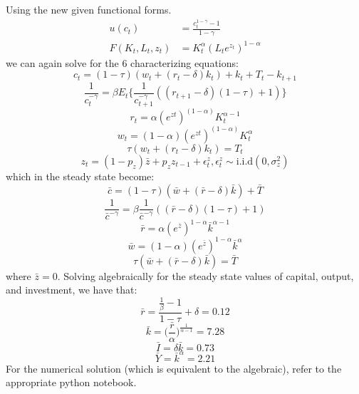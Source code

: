 \documentclass[12pt]{article}
\newenvironment{problem}[2][Problem]{\begin{trivlist}
\item[\hskip \labelsep {\bfseries #1}\hskip \labelsep {\bfseries #2}]}{\end{trivlist}}
\begin{document}
\begin{problem}{5.} 
Using the new given functional forms.
\begin{equation}\label{DSGE_HW_NoLeisure_eq01}
\begin{split}
u(c_t) & = \frac{c^{1-\gamma}_t -1}{1-\gamma}      \\
F(K_t,L_t,z_t) & = K^{\alpha}_t (L_te^{z_t})^{1-\alpha}  \nonumber
\end{split}
\end{equation}
we can again solve for the 6 characterizing equations: 
$$c_t = (1-\tau)(w_t+ (r_t -\delta)k_t) + k_t + T_t - k_{t+1}$$
$$\frac{1}{c_t^{-\gamma}} = \beta E_t \big\{ \frac{1}{c_{t+1}^{-\gamma}}((r_{t+1} - \delta)(1-\tau)+ 1) \big\}$$
$$r_t = \alpha (e^{zt})^{(1-\alpha)} K_t^{\alpha-1} $$
$$w_t = (1-\alpha) (e^{zt})^{(1-\alpha)} K_t^{\alpha} $$
$$\tau(w_t + (r_t -\delta)k_t) = T_t$$
$$z_t = (1-p_z)\bar{z} + p_zz_{t-1} + \epsilon^z_t,  \epsilon^z_t \sim \text{i.i.d}(0, \sigma^2_z)$$
which in the steady state become:
$$\bar{c} = (1-\tau)(\bar{w} + (\bar{r} -\delta)\bar{k}) + \bar{T}$$
$$\frac{1}{\bar{c}^{-\gamma}} = \beta \frac{1}{\bar{c}^{-\gamma}}((\bar{r} - \delta)(1-\tau)+ 1) $$
$$\bar{r} = \alpha (e^{\bar{z}})^{1-\alpha} \bar{k}^{\alpha-1} $$
$$\bar{w} = (1-\alpha) (e^{\bar{z}})^{1-\alpha} \bar{k}^{\alpha} $$
$$\tau(\bar{w} + (\bar{r} -\delta)\bar{k}) =  \bar{T}$$
where $\bar{z} = 0$. Solving algebraically for the steady state values of capital, output, and investment, we have that:
$$\bar{r} = \frac{\frac{1}{\beta}-1}{1-\tau} + \delta = 0.12$$
$$\bar{k} = \big(\frac{\bar{r}}{\alpha}\big)^\frac{1}{\alpha-1} = 7.28$$
$$\bar{I} = \delta \bar{k} = 0.73$$
$$\bar{Y} = \bar{k}^\alpha = 2.21$$
For the numerical solution (which is equivalent to the algebraic), refer to the appropriate python notebook.
 \end{problem}
\end{document}
